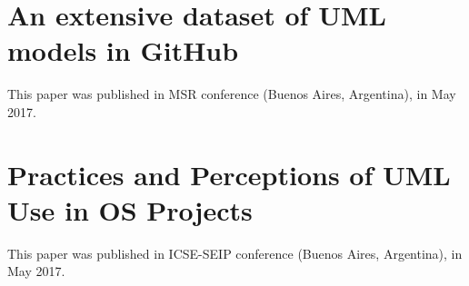 \documentclass[a4paper, 12pt]{book}
\begin{document}
\section{An extensive dataset of UML models in GitHub}
\label{sec:paper-msr}
This paper was published in MSR conference (Buenos Aires, Argentina), in May 2017.

\section{Practices and Perceptions of UML Use in OS Projects}
\label{sec:paper-icse}
This paper was published in ICSE-SEIP conference (Buenos Aires, Argentina), in May 2017.

\cleardoublepage

\end{document}

